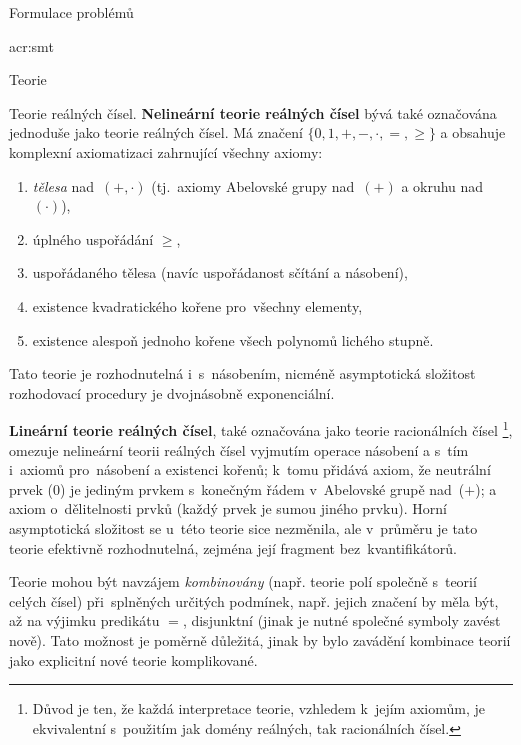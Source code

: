 \documentclass[thesis=M,czech]{FITthesis}[2012/06/26]
\newcommand{\acrlabel}[1]{acr:#1}
\newcommand{\acrf}[1]{\acrfull{\acrlabel{#1}}}
\newcommand{\hl}[1]{\textit{#1}}
\newcommand{\hll}[1]{\textbf{#1}}
\begin{document}
\begin{section}{Formulace problémů}
\begin{subsection}{\acrf{smt}}
\begin{subsubsection}{Teorie}
\begin{paragraph}{Teorie reálných čísel.}
\hll{Nelineární teorie reálných čísel}
bývá také označována jednoduše jako teorie reálných čísel.
Má značení $\{ {0, 1}, {+, -, \cdot}, =, \geq \}$
a obsahuje komplexní axiomatizaci
zahrnující všechny axiomy:
\begin{enumerate}
\item \hl{tělesa} nad~${(+, \cdot)}$
   (tj.~axiomy Abelovské grupy nad~${(+)}$ a okruhu nad ${(\cdot)}$),
\item úplného uspořádání $\geq$,
\item uspořádaného tělesa
   (navíc uspořádanost sčítání a násobení),
\item existence kvadratického kořene pro~všechny elementy,
\item existence alespoň jednoho kořene všech polynomů lichého stupně.
\end{enumerate}
Tato teorie je rozhodnutelná i~s~násobením,
nicméně asymptotická složitost rozhodovací procedury
je dvojnásobně exponenciální.

\hll{Lineární teorie reálných čísel},
také označována jako teorie racionálních čísel%
\footnote{Důvod je ten, že každá interpretace teorie,
vzhledem k~jejím axiomům,
je ekvivalentní s~použitím
jak domény reálných, tak racionálních čísel.},
omezuje nelineární teorii reálných čísel
vyjmutím operace násobení
a s~tím i~axiomů pro~násobení a existenci kořenů;
k~tomu přidává axiom, že neutrální prvek ($0$)
je jediným prvkem s~konečným řádem v~Abelovské grupě nad~($+$);
a axiom o~dělitelnosti prvků
(každý prvek je sumou jiného prvku).
Horní asymptotická složitost se u~této teorie sice nezměnila,
ale v~průměru je tato teorie efektivně rozhodnutelná,
zejména její fragment bez~kvantifikátorů.
\end{paragraph} %


\bigskip

Teorie mohou být navzájem \hl{kombinovány}
(např. teorie polí společně s~teorií celých čísel)
při~splněných určitých podmínek,
např. jejich značení by měla být,
až na výjimku predikátu $=$, disjunktní
(jinak je nutné společné symboly
zavést nově).
Tato možnost je poměrně důležitá,
jinak by bylo zavádění kombinace teorií
jako explicitní nové teorie komplikované.
\end{subsubsection} %


\end{subsection} %



\end{section}
\end{document}
